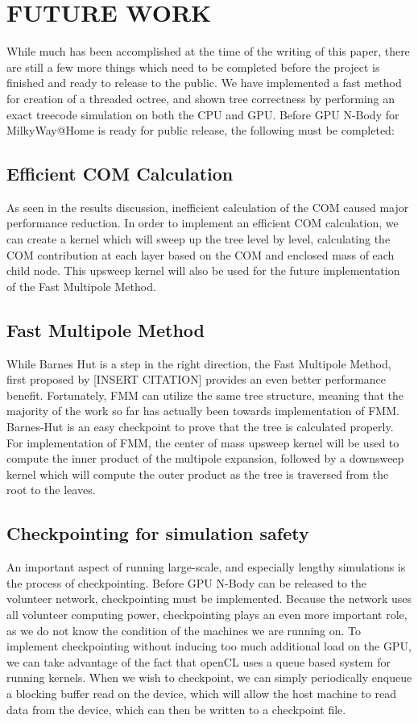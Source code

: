 \documentclass{thesis}
\begin{document}
\chapter{FUTURE WORK}
While much has been accomplished at the time of the writing of this paper, there are still a few more things which need to be completed before the project is finished and ready to release to the public. We have implemented a fast method for creation of a threaded octree, and shown tree correctness by performing an exact treecode simulation on both the CPU and GPU. Before GPU N-Body for MilkyWay@Home is ready for public release, the following must be completed:

\section{Efficient COM Calculation}
As seen in the results discussion, inefficient calculation of the COM caused major performance reduction. In order to implement an efficient COM calculation, we can create a kernel which will sweep up the tree level by level, calculating the COM contribution at each layer based on the COM and enclosed mass of each child node. This upsweep kernel will also be used for the future implementation of the Fast Multipole Method.

\section{Fast Multipole Method}
While Barnes Hut is a step in the right direction, the Fast Multipole Method, first proposed by [INSERT CITATION] provides an even better performance benefit. Fortunately, FMM can utilize the same tree structure, meaning that the majority of the work so far has actually been towards implementation of FMM. Barnes-Hut is an easy checkpoint to prove that the tree is calculated properly. For implementation of FMM, the center of mass upsweep kernel will be used to compute the inner product of the multipole expansion, followed by a downsweep kernel which will compute the outer product as the tree is traversed from the root to the leaves.

\section{Checkpointing for simulation safety}
An important aspect of running large-scale, and especially lengthy simulations is the process of checkpointing. Before GPU N-Body can be released to the volunteer network, checkpointing must be implemented. Because the network uses all volunteer computing power, checkpointing plays an even more important role, as we do not know the condition of the machines we are running on. To implement checkpointing without inducing too much additional load on the GPU, we can take advantage of the fact that openCL uses a queue based system for running kernels. When we wish to checkpoint, we can simply periodically enqueue a blocking buffer read on the device, which will allow the host machine to read data from the device, which can then be written to a checkpoint file.
\end{document}
